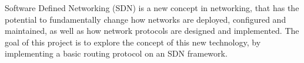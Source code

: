 Software Defined Networking (SDN) is a new concept in networking, that has the potential to fundamentally change how networks are deployed, configured and maintained, as well as how network protocols are designed and implemented. The goal of this project is to explore the concept of this new technology, by implementing a basic routing protocol on an SDN framework.
